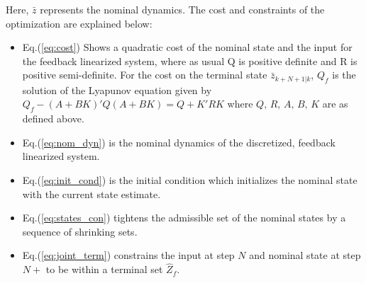 Here, $\bar{z}$ represents the nominal dynamics. The cost and constraints of the optimization are explained below:
\begin{itemize}
\item Eq.(\ref{eq:cost}) Shows a quadratic cost of the nominal state and the input for the feedback linearized system, where as usual Q is positive definite and R is positive semi-definite. For the cost on the terminal state $\bar{z}_{k+N+1|k}$, $Q_f$ is the solution of the Lyapunov equation given by $Q_f-(A+BK)'Q(A+BK) = Q+K'RK$ where $Q,\,R,\,A,\,B,\,K$ are as defined above.

\item Eq.(\ref{eq:nom_dyn}) is the nominal dynamics of the discretized, feedback linearized system.

\item Eq.(\ref{eq:init_cond}) is the initial condition which initializes the nominal state with the current state estimate.

\item Eq.(\ref{eq:states_con}) tightens the admissible set of the nominal states by a sequence of shrinking sets.

\item Eq.(\ref{eq:joint_term}) constrains the input at step $N$ and nominal state at step $N+$  to be within a terminal set $\hat{Z}_f$.

\end{itemize}




